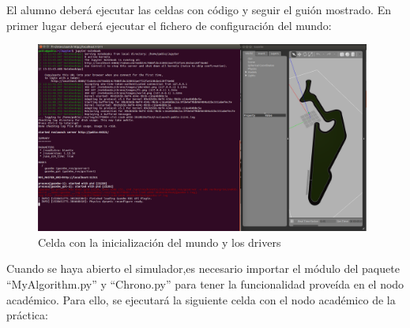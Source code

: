 El alumno deberá ejecutar las celdas con código y seguir el guión mostrado. En primer lugar deberá ejecutar el fichero de configuración del mundo:

\begin{figure}[H]
  \begin{center}
    \includegraphics[width=0.98\textwidth]{figures/celda_mundo_chrono.png}
		\caption{Celda con la inicialización del mundo y los drivers}
		\label{fig.cmdc}
		\end{center}
\end{figure}

Cuando se haya abierto el simulador,es necesario importar el módulo del paquete ``MyAlgorithm.py'' y ``Chrono.py'' para tener la funcionalidad proveída en el nodo académico. Para ello, se ejecutará la siguiente celda con el nodo académico de la práctica:

